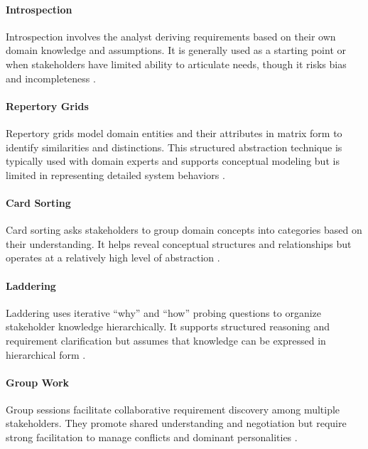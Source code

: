 \paragraph{Introspection}

Introspection involves the analyst deriving requirements based on their own domain knowledge and assumptions. It is generally used as a starting point or when stakeholders have limited ability to articulate needs, though it risks bias and incompleteness \cite{Goguen1993}.

\paragraph{Repertory Grids}

Repertory grids model domain entities and their attributes in matrix form to identify similarities and distinctions. This structured abstraction technique is typically used with domain experts and supports conceptual modeling but is limited in representing detailed system behaviors \cite{Kelly1955}.

\paragraph{Card Sorting}

Card sorting asks stakeholders to group domain concepts into categories based on their understanding. It helps reveal conceptual structures and relationships but operates at a relatively high level of abstraction \cite{Beck1989}.

\paragraph{Laddering}

Laddering uses iterative “why” and “how” probing questions to organize stakeholder knowledge hierarchically. It supports structured reasoning and requirement clarification but assumes that knowledge can be expressed in hierarchical form \cite{Hinkle1965}.

\paragraph{Group Work}

Group sessions facilitate collaborative requirement discovery among multiple stakeholders. They promote shared understanding and negotiation but require strong facilitation to manage conflicts and dominant personalities \cite{Gottesdiener2002}.


